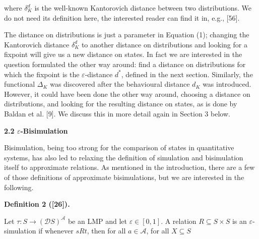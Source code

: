 where $\delta_{K}^{d}$ is the well-known Kantorovich distance between two distributions. We do not need its definition here, the interested reader can find it in, e.g., [56].\par
 
  
 
The distance on distributions is just a parameter in Equation (1); changing the Kantorovich distance $\delta_{K}^{d}$ to another distance on distributions and looking for a fixpoint will give us a new distance on states. In fact we are interested in the question formulated the other way around: find a distance on distributions for which the fixpoint is the $\varepsilon$-distance $d^{*}$, defined in the next section. Similarly, the functional $\Delta_{K}$ was discovered after the behavioural distance $d_{K}$ was introduced. However, it could have been done the other way around, choosing a distance on distributions, and looking for the resulting distance on states, as is done by Baldan et al. [9]. We discuss this in more detail again in Section 3 below.\par
 
 
 
 
\par\medskip\noindent\textbf{2.2 $\varepsilon$-Bisimulation}\par
 
 
Bisimulation, being too strong for the comparison of states in quantitative systems, has also led to relaxing the definition of simulation and bisimulation itself to approximate relations. As mentioned in the introduction, there are a few of those definitions of approximate bisimulations, but we are interested in the following.\par
 
 
 
\par\medskip\noindent\textbf{Definition 2 ([26]).}\par
 
 
Let $\tau:S\to(\mathcal{D}S)^{\mathcal{A}}$ be an LMP and let $\varepsilon\in[0,1]$. A relation $R\subseteq S\times S$ is an $\varepsilon$-simulation if whenever $sRt$, then for all $a\in\mathcal{A}$, for all $X\subseteq S$\par
  
